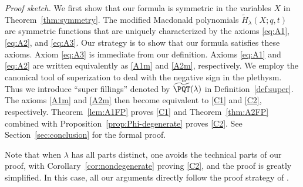 \noindent\emph{Proof sketch.} We first show that our formula is symmetric in the variables $X$ in Theorem~\ref{thm:symmetry}. The modified Macdonald polynomials $\widetilde{H}_{\lambda}(X;q,t)$ are symmetric functions that are uniquely characterized by the axioms \eqref{eq:A1}, \eqref{eq:A2}, and \eqref{eq:A3}. Our strategy is to show that our formula satisfies these axioms. Axiom \eqref{eq:A3} is immediate from our definition. Axioms \eqref{eq:A1} and \eqref{eq:A2} are written equivalently as \eqref{A1m} and \eqref{A2m}, respectively. We employ the canonical tool of superization to deal with the negative sign in the plethysm. Thus we introduce ``super fillings'' denoted by $\widetilde{\PQT}(\lambda)$ in Definition~\ref{def:super}. The axioms \eqref{A1m} and \eqref{A2m} then become equivalent to \eqref{C1} and \eqref{C2}, respectively. Theorem~\ref{lem:A1FP} proves \eqref{C1} and Theorem~\ref{thm:A2FP} combined with Proposition~\ref{prop:Phi-degenerate} proves \eqref{C2}. See Section~\ref{sec:conclusion} for the formal proof.

\begin{remark}
Note that when $\lambda$ has all parts distinct, one avoids the technical parts of our proof, with Corollary~\ref{cor:nondegenerate} proving \eqref{C2}, and the proof is greatly simplified. In this case, all our arguments directly follow the proof strategy of \cite[Theorem 2.2]{HHL05}.
\end{remark}

